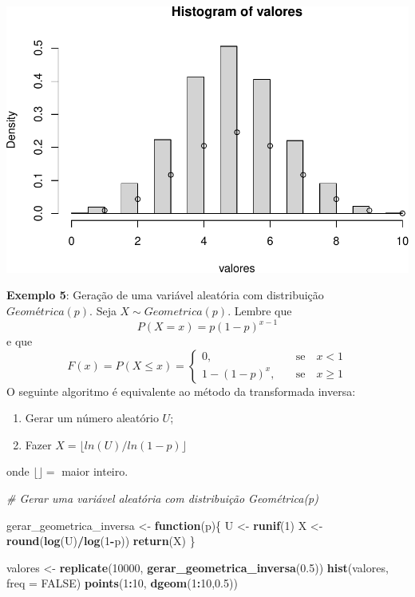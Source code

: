 \documentclass[
]{book}
\newenvironment{Shaded}{\begin{snugshade}}{\end{snugshade}}
\newcommand{\AttributeTok}[1]{\textcolor[rgb]{0.13,0.29,0.53}{#1}}
\newcommand{\CommentTok}[1]{\textcolor[rgb]{0.56,0.35,0.01}{\textit{#1}}}
\newcommand{\ConstantTok}[1]{\textcolor[rgb]{0.56,0.35,0.01}{#1}}
\newcommand{\ControlFlowTok}[1]{\textcolor[rgb]{0.13,0.29,0.53}{\textbf{#1}}}
\newcommand{\DecValTok}[1]{\textcolor[rgb]{0.00,0.00,0.81}{#1}}
\newcommand{\FloatTok}[1]{\textcolor[rgb]{0.00,0.00,0.81}{#1}}
\newcommand{\FunctionTok}[1]{\textcolor[rgb]{0.13,0.29,0.53}{\textbf{#1}}}
\newcommand{\NormalTok}[1]{#1}
\newcommand{\OtherTok}[1]{\textcolor[rgb]{0.56,0.35,0.01}{#1}}
\newcommand{\SpecialCharTok}[1]{\textcolor[rgb]{0.81,0.36,0.00}{\textbf{#1}}}
\begin{document}
\includegraphics{introR_files/figure-latex/unnamed-chunk-235-1.pdf}

\textbf{Exemplo 5}: Geração de uma variável aleatória com distribuição
\(Geométrica(p)\). Seja \(X\sim Geometrica(p)\). Lembre que
\[P(X=x)=p(1-p)^{x-1}\] e que
\[F(x) = P(X\leq x) = \begin{cases} 0,& \quad \text{se} \quad x<1 \\
1-(1-p)^x,& \quad \text{se} \quad x\geq 1\end{cases}\] O seguinte
algoritmo é equivalente ao método da transformada inversa:

\begin{enumerate}
\def\labelenumi{\arabic{enumi}.}
\item
  Gerar um número aleatório \(U\);
\item
  Fazer \(X = \lfloor ln(U)/ln(1-p)\rfloor\)
\end{enumerate}

onde \(\lfloor  \rfloor =\) maior inteiro.

\begin{Shaded}
\begin{Highlighting}[]
\CommentTok{\# Gerar uma variável aleatória com distribuição Geométrica(p)}

\NormalTok{gerar\_geometrica\_inversa }\OtherTok{\textless{}{-}} \ControlFlowTok{function}\NormalTok{(p)\{}
\NormalTok{  U }\OtherTok{\textless{}{-}} \FunctionTok{runif}\NormalTok{(}\DecValTok{1}\NormalTok{)}
\NormalTok{  X }\OtherTok{\textless{}{-}} \FunctionTok{round}\NormalTok{(}\FunctionTok{log}\NormalTok{(U)}\SpecialCharTok{/}\FunctionTok{log}\NormalTok{(}\DecValTok{1}\SpecialCharTok{{-}}\NormalTok{p))}
  \FunctionTok{return}\NormalTok{(X)}
\NormalTok{\}}

\NormalTok{valores }\OtherTok{\textless{}{-}} \FunctionTok{replicate}\NormalTok{(}\DecValTok{10000}\NormalTok{, }\FunctionTok{gerar\_geometrica\_inversa}\NormalTok{(}\FloatTok{0.5}\NormalTok{))}
\FunctionTok{hist}\NormalTok{(valores, }\AttributeTok{freq =} \ConstantTok{FALSE}\NormalTok{)}
\FunctionTok{points}\NormalTok{(}\DecValTok{1}\SpecialCharTok{:}\DecValTok{10}\NormalTok{, }\FunctionTok{dgeom}\NormalTok{(}\DecValTok{1}\SpecialCharTok{:}\DecValTok{10}\NormalTok{,}\FloatTok{0.5}\NormalTok{))}
\end{Highlighting}
\end{Shaded}
\end{document}
